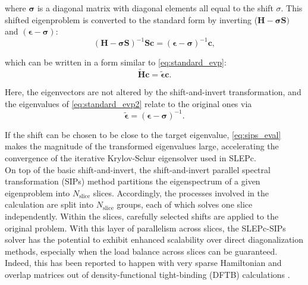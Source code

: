 \documentclass{report}
\begin{document}
where $\boldsymbol{\sigma}$ is a diagonal matrix with diagonal elements all equal to the shift $\sigma$.  This shifted eigenproblem is converted to the standard form by inverting ($\boldsymbol{H} - \boldsymbol{\sigma S})$ and $(\boldsymbol{\epsilon - \sigma})$:\\
\begin{equation}
\label{eq:invert}
(\boldsymbol{H} - \boldsymbol{\sigma S})^{-1} \boldsymbol{S} \boldsymbol{c} = (\boldsymbol{\epsilon - \sigma})^{-1} \boldsymbol{c} ,
\end{equation}

which can be written in a form similar to \ref{eq:standard_evp}:\\
\begin{equation}
\label{eq:standard_evp2}
\boldsymbol{\tilde{H}} \boldsymbol{c} = \boldsymbol{\tilde{\epsilon}} \boldsymbol{c} .
\end{equation}

Here, the eigenvectors are not altered by the shift-and-invert transformation, and the eigenvalues of \ref{eq:standard_evp2} relate to the original ones via\\
\begin{equation}
\label{eq:sips_eval}
\boldsymbol{\tilde{\epsilon}} = (\boldsymbol{\epsilon - \sigma})^{-1} .
\end{equation}

If the shift can be chosen to be close to the target eigenvalue, \ref{eq:sips_eval} makes the magnitude of the transformed eigenvalues large, accelerating the convergence of the iterative Krylov-Schur eigensolver used in SLEPc.\\

On top of the basic shift-and-invert, the shift-and-invert parallel spectral transformation (SIPs) method \cite{sips_keceli_2016} partitions the eigenspectrum of a given eigenproblem into $N_\text{slice}$ slices.  Accordingly, the processes involved in the calculation are split into $N_\text{slice}$ groups, each of which solves one slice independently.  Within the slices, carefully selected shifts are applied to the original problem.  With this layer of parallelism across slices, the SLEPc-SIPs solver has the potential to exhibit enhanced scalability over direct diagonalization methods, especially when the load balance across slices can be guaranteed.  Indeed, this has been reported to happen with very sparse Hamiltonian and overlap matrices out of density-functional tight-binding (DFTB) calculations \cite{sips_keceli_2016}.\\
\end{document}
